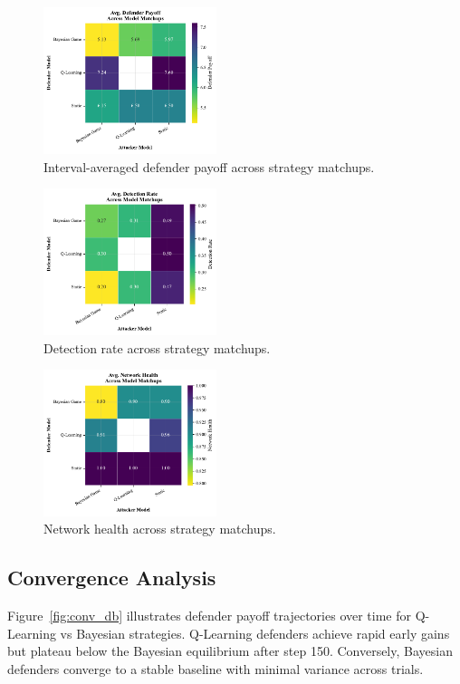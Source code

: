 \documentclass[conference]{IEEEtran}
\begin{document}
\begin{figure}[htbp]
  \centering
  \includegraphics[width=0.45\textwidth]{fig_def_payoff_heatmap.pdf}
  \caption{Interval-averaged defender payoff across strategy matchups.}
  \label{fig:def_payoff_heatmap}
\end{figure}

\begin{figure}[htbp]
  \centering
  \includegraphics[width=0.45\textwidth]{fig_detection_heatmap.pdf}
  \caption{Detection rate across strategy matchups.}
  \label{fig:detection_heatmap}
\end{figure}

\begin{figure}[htbp]
  \centering
  \includegraphics[width=0.45\textwidth]{fig_net_health_heatmap.pdf}
  \caption{Network health across strategy matchups.}
  \label{fig:health_heatmap}
\end{figure}

\subsection{Convergence Analysis}
Figure~\ref{fig:conv_db} illustrates defender payoff trajectories over time for Q-Learning vs Bayesian strategies. Q-Learning defenders achieve rapid early gains but plateau below the Bayesian equilibrium after step 150. Conversely, Bayesian defenders converge to a stable baseline with minimal variance across trials.
\end{document}
